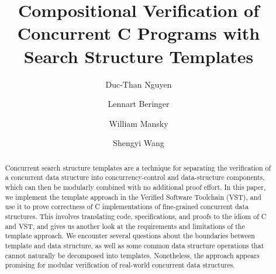 \documentclass[sigplan,10pt, screen]{acmart}
\begin{document}
\title{Compositional Verification of Concurrent C Programs with Search Structure Templates}


\author{Duc-Than Nguyen}

\author{Lennart Beringer}

\author{William Mansky}

\author{Shengyi Wang}


\begin{abstract}
Concurrent search structure templates are a technique for separating the verification of a concurrent data structure into concurrency-control and data-structure components, which can then be modularly combined with no additional proof effort. In this paper, we implement the template approach in the Verified Software Toolchain (VST), and use it to prove correctness of C implementations of fine-grained concurrent data structures. This involves translating code, specifications, and proofs to the idiom of C and VST, and gives us another look at the requirements and limitations of the template approach.
We encounter several questions about the boundaries between template and data structure, as well as some common data structure operations that cannot naturally be decomposed into templates. Nonetheless, the approach appears promising for modular verification of real-world concurrent data structures.
\end{abstract}
\end{document}
